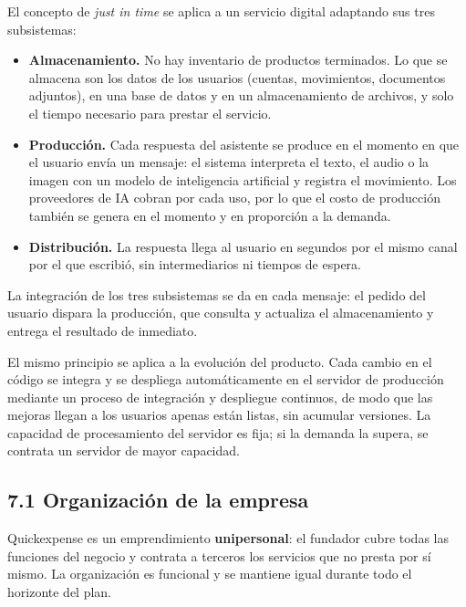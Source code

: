 El concepto de \emph{just in time} se aplica a un servicio digital
adaptando sus tres subsistemas:

\begin{itemize}
\tightlist
\item
  \textbf{Almacenamiento.} No hay inventario de productos terminados. Lo
  que se almacena son los datos de los usuarios (cuentas, movimientos,
  documentos adjuntos), en una base de datos y en un almacenamiento de
  archivos, y solo el tiempo necesario para prestar el servicio.
\item
  \textbf{Producción.} Cada respuesta del asistente se produce en el
  momento en que el usuario envía un mensaje: el sistema interpreta el
  texto, el audio o la imagen con un modelo de inteligencia artificial y
  registra el movimiento. Los proveedores de IA cobran por cada uso, por
  lo que el costo de producción también se genera en el momento y en
  proporción a la demanda.
\item
  \textbf{Distribución.} La respuesta llega al usuario en segundos por
  el mismo canal por el que escribió, sin intermediarios ni tiempos de
  espera.
\end{itemize}

La integración de los tres subsistemas se da en cada mensaje: el pedido
del usuario dispara la producción, que consulta y actualiza el
almacenamiento y entrega el resultado de inmediato.

El mismo principio se aplica a la evolución del producto. Cada cambio en
el código se integra y se despliega automáticamente en el servidor de
producción mediante un proceso de integración y despliegue continuos, de
modo que las mejoras llegan a los usuarios apenas están listas, sin
acumular versiones. La capacidad de procesamiento del servidor es fija;
si la demanda la supera, se contrata un servidor de mayor capacidad.


\subsection*{7.1 Organización de la
empresa}\label{organizaciuxf3n-de-la-empresa}

Quickexpense es un emprendimiento \textbf{unipersonal}: el fundador
cubre todas las funciones del negocio y contrata a terceros los
servicios que no presta por sí mismo. La organización es funcional y se
mantiene igual durante todo el horizonte del plan.

